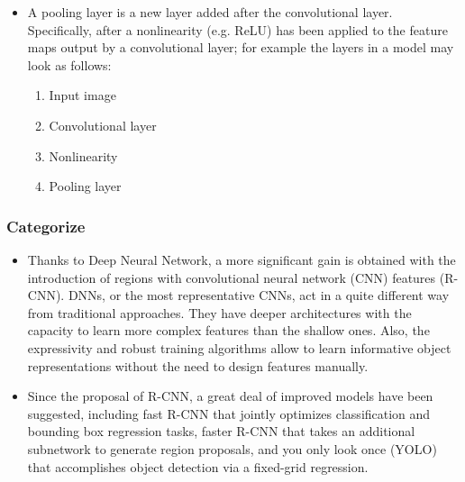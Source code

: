 \begin{itemize}
                \item A pooling layer is a new layer added after the convolutional layer. Specifically, after a nonlinearity (e.g. ReLU) has been applied to the feature maps output by a convolutional layer; for example the layers in a model may look as follows:
                    \begin{enumerate}
                        \item Input image
                        \item Convolutional layer
                        \item Nonlinearity
                        \item Pooling layer
                    \end{enumerate}
            \end{itemize}

        \subsubsection{Categorize}
            \begin{itemize}
                \item Thanks to Deep Neural Network, a more significant gain is obtained with the introduction of regions with convolutional neural network (CNN) features (R-CNN). DNNs, or the most representative CNNs, act in a quite different way from traditional approaches. They have deeper architectures with the capacity to learn more complex features than the shallow ones. Also, the expressivity and robust training algorithms allow to learn informative object representations without the need to design features manually.
                \item Since the proposal of R-CNN, a great deal of improved models have been suggested, including fast R-CNN that jointly optimizes classification and bounding box regression tasks, faster R-CNN that takes an additional subnetwork to generate region proposals, and you only look once (YOLO) that accomplishes object detection via a fixed-grid regression.
            \end{itemize}

